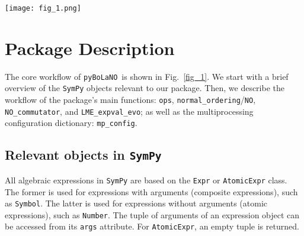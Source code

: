 \documentclass[5p, twocolumn, 10pt, sort&compress]{elsarticle}
\newcounter{bla}
\newcommand{\inlinecode}[1]{\texttt{#1}}
\newcommand{\pybolano}{\texttt{pyBoLaNO}~}
\begin{document}

\begin{figure*}[!t]
    \centering
    \texttt{[image: fig\_1.png]}
    \caption{Core functionalities of \pybolano. The main functions are shown in blue, while the core utility functions are colored black. Meanwhile, the purple-colored \inlinecode{mp_config} is a \texttt{Python} variable. Red connectors show symbolic workflows, while green connectors show visual workflows. Dashed rectangles indicate functionalities that are not accessible by the user.}
    \label{fig_1}
\end{figure*}


\section{Package Description}\label{section:package_anatomy}

The core workflow of \pybolano is shown in Fig.~\ref{fig_1}. We start with a brief overview of the \texttt{SymPy} objects relevant to our package. Then, we describe the workflow of the package's main functions: \inlinecode{ops}, \inlinecode{normal_ordering}/\inlinecode{NO}, \inlinecode{NO_commutator}, and \inlinecode{LME_expval_evo}; as well as the multiprocessing configuration dictionary: \inlinecode{mp_config}.

\subsection{Relevant objects in \texttt{SymPy}}
\label{subsec_sympy_objects}

All algebraic expressions in \texttt{SymPy} are based on the \inlinecode{Expr} or \inlinecode{AtomicExpr} class. The former is used for expressions with arguments (composite expressions), such as \inlinecode{Symbol}. The latter is used for expressions without arguments (atomic expressions), such as \inlinecode{Number}. The tuple of arguments of an expression object can be accessed from its \inlinecode{args} attribute.  For \inlinecode{AtomicExpr}, an empty tuple is returned. 
\end{document}
